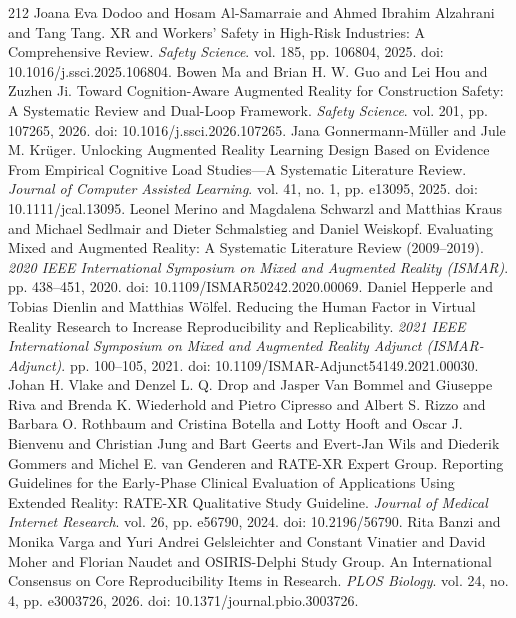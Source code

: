 \begin{thebibliography}{212}
 Joana Eva Dodoo and Hosam Al-Samarraie and Ahmed Ibrahim Alzahrani and Tang Tang. {XR} and Workers' Safety in High-Risk Industries: A Comprehensive Review. \emph{Safety Science}. vol. 185, pp. 106804, 2025. doi: 10.1016/j.ssci.2025.106804.
 Bowen Ma and Brian H. W. Guo and Lei Hou and Zuzhen Ji. Toward Cognition-Aware Augmented Reality for Construction Safety: A Systematic Review and Dual-Loop Framework. \emph{Safety Science}. vol. 201, pp. 107265, 2026. doi: 10.1016/j.ssci.2026.107265.
 Jana Gonnermann-M{\"u}ller and Jule M. Kr{\"u}ger. Unlocking Augmented Reality Learning Design Based on Evidence From Empirical Cognitive Load Studies---A Systematic Literature Review. \emph{Journal of Computer Assisted Learning}. vol. 41, no. 1, pp. e13095, 2025. doi: 10.1111/jcal.13095.
 Leonel Merino and Magdalena Schwarzl and Matthias Kraus and Michael Sedlmair and Dieter Schmalstieg and Daniel Weiskopf. Evaluating Mixed and Augmented Reality: A Systematic Literature Review (2009--2019). \emph{2020 IEEE International Symposium on Mixed and Augmented Reality (ISMAR)}. pp. 438--451, 2020. doi: 10.1109/ISMAR50242.2020.00069.
 Daniel Hepperle and Tobias Dienlin and Matthias W{\"o}lfel. Reducing the Human Factor in Virtual Reality Research to Increase Reproducibility and Replicability. \emph{2021 IEEE International Symposium on Mixed and Augmented Reality Adjunct (ISMAR-Adjunct)}. pp. 100--105, 2021. doi: 10.1109/ISMAR-Adjunct54149.2021.00030.
 Johan H. Vlake and Denzel L. Q. Drop and Jasper Van Bommel and Giuseppe Riva and Brenda K. Wiederhold and Pietro Cipresso and Albert S. Rizzo and Barbara O. Rothbaum and Cristina Botella and Lotty Hooft and Oscar J. Bienvenu and Christian Jung and Bart Geerts and Evert-Jan Wils and Diederik Gommers and Michel E. van Genderen and {RATE-XR Expert Group}. Reporting Guidelines for the Early-Phase Clinical Evaluation of Applications Using Extended Reality: {RATE-XR} Qualitative Study Guideline. \emph{Journal of Medical Internet Research}. vol. 26, pp. e56790, 2024. doi: 10.2196/56790.
 Rita Banzi and Monika Varga and Yuri Andrei Gelsleichter and Constant Vinatier and David Moher and Florian Naudet and {OSIRIS-Delphi Study Group}. An International Consensus on Core Reproducibility Items in Research. \emph{PLOS Biology}. vol. 24, no. 4, pp. e3003726, 2026. doi: 10.1371/journal.pbio.3003726.

\end{thebibliography}
